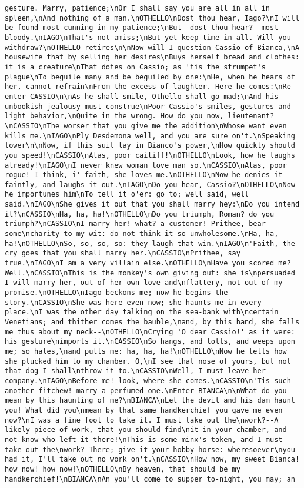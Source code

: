 \begin{verbatim}
gesture. Marry, patience;\nOr I shall say you are all in all in spleen,\nAnd nothing of a man.\nOTHELLO\nDost thou hear, Iago?\nI will be found most cunning in my patience;\nBut--dost thou hear?--most bloody.\nIAGO\nThat's not amiss;\nBut yet keep time in all. Will you withdraw?\nOTHELLO retires\n\nNow will I question Cassio of Bianca,\nA housewife that by selling her desires\nBuys herself bread and clothes: it is a creature\nThat dotes on Cassio; as 'tis the strumpet's plague\nTo beguile many and be beguiled by one:\nHe, when he hears of her, cannot refrain\nFrom the excess of laughter. Here he comes:\nRe-enter CASSIO\n\nAs he shall smile, Othello shall go mad;\nAnd his unbookish jealousy must construe\nPoor Cassio's smiles, gestures and light behavior,\nQuite in the wrong. How do you now, lieutenant?\nCASSIO\nThe worser that you give me the addition\nWhose want even kills me.\nIAGO\nPly Desdemona well, and you are sure on't.\nSpeaking lower\n\nNow, if this suit lay in Bianco's power,\nHow quickly should you speed!\nCASSIO\nAlas, poor caitiff!\nOTHELLO\nLook, how he laughs already!\nIAGO\nI never knew woman love man so.\nCASSIO\nAlas, poor rogue! I think, i' faith, she loves me.\nOTHELLO\nNow he denies it faintly, and laughs it out.\nIAGO\nDo you hear, Cassio?\nOTHELLO\nNow he importunes him\nTo tell it o'er: go to; well said, well said.\nIAGO\nShe gives it out that you shall marry hey:\nDo you intend it?\nCASSIO\nHa, ha, ha!\nOTHELLO\nDo you triumph, Roman? do you triumph?\nCASSIO\nI marry her! what? a customer! Prithee, bear some\ncharity to my wit: do not think it so unwholesome.\nHa, ha, ha!\nOTHELLO\nSo, so, so, so: they laugh that win.\nIAGO\n'Faith, the cry goes that you shall marry her.\nCASSIO\nPrithee, say true.\nIAGO\nI am a very villain else.\nOTHELLO\nHave you scored me? Well.\nCASSIO\nThis is the monkey's own giving out: she is\npersuaded I will marry her, out of her own love and\nflattery, not out of my promise.\nOTHELLO\nIago beckons me; now he begins the story.\nCASSIO\nShe was here even now; she haunts me in every place.\nI was the other day talking on the sea-bank with\ncertain Venetians; and thither comes the bauble,\nand, by this hand, she falls me thus about my neck--\nOTHELLO\nCrying 'O dear Cassio!' as it were: his gesture\nimports it.\nCASSIO\nSo hangs, and lolls, and weeps upon me; so hales,\nand pulls me: ha, ha, ha!\nOTHELLO\nNow he tells how she plucked him to my chamber. O,\nI see that nose of yours, but not that dog I shall\nthrow it to.\nCASSIO\nWell, I must leave her company.\nIAGO\nBefore me! look, where she comes.\nCASSIO\n'Tis such another fitchew! marry a perfumed one.\nEnter BIANCA\n\nWhat do you mean by this haunting of me?\nBIANCA\nLet the devil and his dam haunt you! What did you\nmean by that same handkerchief you gave me even now?\nI was a fine fool to take it. I must take out the\nwork?--A likely piece of work, that you should find\nit in your chamber, and not know who left it there!\nThis is some minx's token, and I must take out the\nwork? There; give it your hobby-horse: wheresoever\nyou had it, I'll take out no work on't.\nCASSIO\nHow now, my sweet Bianca! how now! how now!\nOTHELLO\nBy heaven, that should be my handkerchief!\nBIANCA\nAn you'll come to supper to-night, you may; an 
\end{verbatim}
